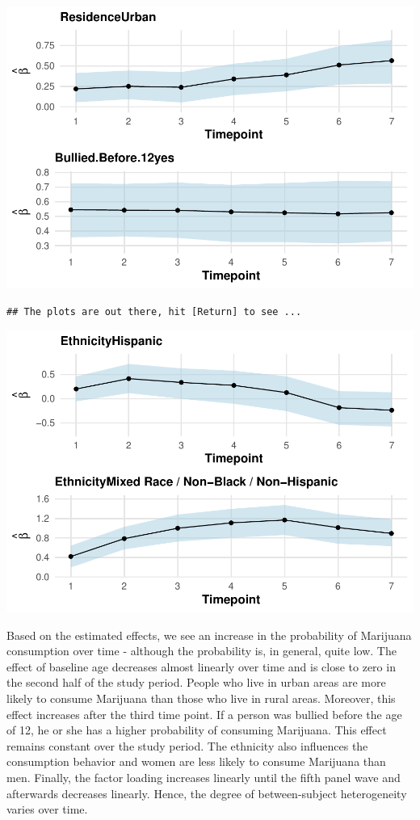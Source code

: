 \documentclass[a4paper, preprint, 3p,
authoryear]{elsarticle} %
\newcommand{\pandocbounded}[1]{#1}
\begin{document}
\pandocbounded{\includegraphics[keepaspectratio]{Vignette-for-panelTVP_files/figure-latex/unnamed-chunk-34-3.pdf}}

\begin{verbatim}
## The plots are out there, hit [Return] to see ...
\end{verbatim}

\pandocbounded{\includegraphics[keepaspectratio]{Vignette-for-panelTVP_files/figure-latex/unnamed-chunk-34-4.pdf}}

Based on the estimated effects, we see an increase in the probability of
Marijuana consumption over time - although the probability is, in
general, quite low. The effect of baseline age decreases almost linearly
over time and is close to zero in the second half of the study period.
People who live in urban areas are more likely to consume Marijuana than
those who live in rural areas. Moreover, this effect increases after the
third time point. If a person was bullied before the age of 12, he or
she has a higher probability of consuming Marijuana. This effect remains
constant over the study period. The ethnicity also influences the
consumption behavior and women are less likely to consume Marijuana than
men. Finally, the factor loading increases linearly until the fifth
panel wave and afterwards decreases linearly. Hence, the degree of
between-subject heterogeneity varies over time.
\end{document}
